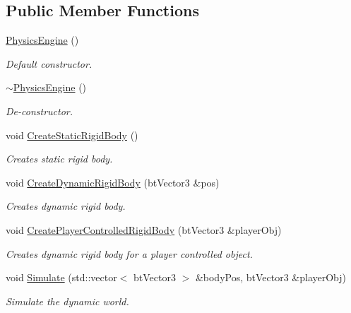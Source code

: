 \subsection*{Public Member Functions}
\begin{CompactItemize}
\item 
\hyperlink{class_physics_engine_7fc9180ea453680df0b863fa157c5b92}{PhysicsEngine} ()
\begin{CompactList}\small\item\em Default constructor. \item\end{CompactList}\item 
\hyperlink{class_physics_engine_e5f076ee99bbfdbc79ab2d27366d8476}{$\sim$PhysicsEngine} ()
\begin{CompactList}\small\item\em De-constructor. \item\end{CompactList}\item 
void \hyperlink{class_physics_engine_758fafb4fe8d295b3710644de4d22d4a}{CreateStaticRigidBody} ()
\begin{CompactList}\small\item\em Creates static rigid body. \item\end{CompactList}\item 
void \hyperlink{class_physics_engine_549c7e9116d06e8f7599497c3c4f6fd1}{CreateDynamicRigidBody} (btVector3 \&pos)
\begin{CompactList}\small\item\em Creates dynamic rigid body. \item\end{CompactList}\item 
void \hyperlink{class_physics_engine_6096d332305e50fba86f377c00ec27e0}{CreatePlayerControlledRigidBody} (btVector3 \&playerObj)
\begin{CompactList}\small\item\em Creates dynamic rigid body for a player controlled object. \item\end{CompactList}\item 
void \hyperlink{class_physics_engine_9d6bec05e95efd4b9168b507a90883b9}{Simulate} (std::vector$<$ btVector3 $>$ \&bodyPos, btVector3 \&playerObj)
\begin{CompactList}\small\item\em Simulate the dynamic world. \item\end{CompactList}\item 

\end{CompactItemize}

